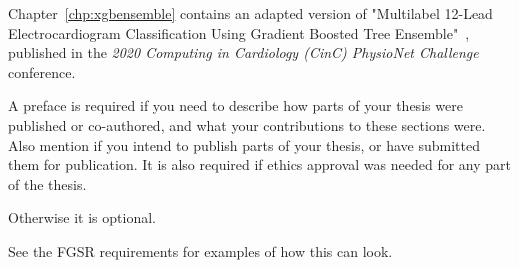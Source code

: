 \documentclass[\main/thesis.tex]{subfiles}
\begin{document}
\begin{preface}

Chapter~\ref{chp:xgbensemble} contains an adapted version of "Multilabel 12-Lead Electrocardiogram Classification Using Gradient Boosted Tree Ensemble"~\cite{wong2020CINC-multilabel-ECG}, published in the \emph{2020 Computing in Cardiology (CinC) PhysioNet Challenge} conference.

A preface is required if you need to describe how parts of your thesis were
published or co-authored, and what your contributions to these sections were.
Also mention if you intend to publish parts of your thesis,
or have submitted them for publication. 
It is also required if ethics approval was needed for any part of the thesis.

Otherwise it is optional.

See the FGSR requirements for examples of how this can look.
\end{preface}
\end{document}
